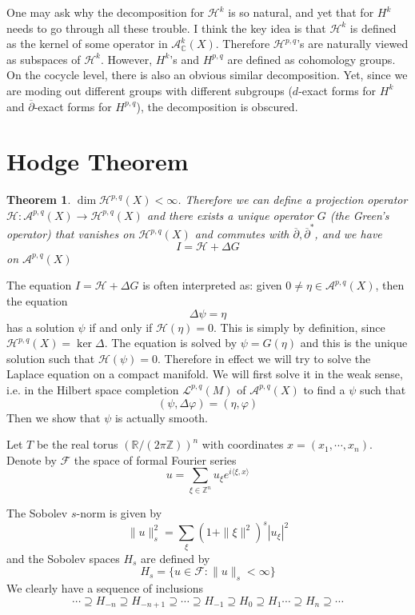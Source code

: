 \documentclass[12pt]{article}
\theoremstyle{plain}
\newtheorem{theorem}[equation]{Theorem}
\theoremstyle{definition}
\newcommand{\IC}{\mathbb{C}}
\newcommand{\IR}{\mathbb{R}}
\newcommand{\IZ}{\mathbb{Z}}
\newcommand{\<}{\langle}
\renewcommand{\>}{\rangle}
\newcommand{\p}{\partial}
\newcommand{\sH}{\mathcal{H}}
\newcommand{\sL}{\mathcal{L}}
\newcommand{\shF}{\mathscr{F}}
\newcommand{\bp}{\overline{\p}}
\newcommand{\sA}{\mathcal{A}}
\begin{document}
One may ask why the decomposition for $\sH^k$ is so natural, and yet that for $H^k$ needs to go through all these trouble. I think the key idea is that $\sH^k$ is defined as the kernel of some operator in $\sA^k_\IC(X)$. Therefore $\sH^{p, q}$'s are naturally viewed as subspaces of $\sH^k$. However, $H^k$'s and $H^{p, q}$ are defined as cohomology groups. On the cocycle level, there is also an obvious similar decomposition. Yet, since we are moding out different groups with different subgroups ($d$-exact forms for $H^k$ and $\bp$-exact forms for $H^{p, q}$), the decomposition is obscured. 

\section{Hodge Theorem}
\begin{theorem}
$\dim \sH^{p, q}(X) < \infty$. Therefore we can define a projection operator $\sH : \sA^{p, q}(X) \to \sH^{p, q}(X)$ and there exists a unique operator $G$ (the \textit{Green's} operator) that vanishes on $\sH^{p, q}(X)$ and commutes with $\bp, \bp^*$, and we have 
$$ I = \sH + \Delta G $$ on $\sA^{p, q}(X)$
\end{theorem}
The equation $I = \sH + \Delta G$ is often interpreted as: given $0 \neq \eta \in \sA^{p, q}(X)$, then the equation 
$$ \Delta \psi = \eta $$
has a solution $\psi$ if and only if $\sH(\eta) = 0$. This is simply by definition, since $\sH^{p, q}(X) = \ker \Delta$. The equation is solved by $\psi = G(\eta)$ and this is the unique solution such that $\sH(\psi) = 0$. Therefore in effect we will try to solve the Laplace equation on a compact manifold. We will first solve it in the weak sense, i.e. in the Hilbert space completion $\sL^{p, q}(M)$ of $\sA^{p, q}(X)$ to find a $\psi$ such that 
$$ (\psi, \Delta \varphi) = (\eta, \varphi) $$ 
Then we show that $\psi$ is actually smooth. 

Let $T$ be the real torus $(\IR/(2\pi \IZ))^n$ with coordinates $x = (x_1, \cdots, x_n)$. Denote by $\shF$ the space of formal Fourier series 
$$ u = \sum_{\xi \in \IZ^n} u_\xi e^{i\< \xi, x \>} $$

The Sobolev $s$-norm is given by 
$$ \| u \|_s^2 = \sum_{\xi} (1 + \| \xi \|^2)^s |u_\xi|^2 $$ and the Sobolev spaces $H_s$ are defined by 
$$ H_s = \{ u \in \shF : \| u \|_s < \infty \} $$
We clearly have a sequence of inclusions 
$$ \cdots \supseteq H_{-n} \supseteq H_{-n + 1} \supseteq \cdots \supseteq H_{-1} \supseteq H_{0} \supseteq H_{1} \cdots \supseteq H_n \supseteq \cdots $$
\end{document}
